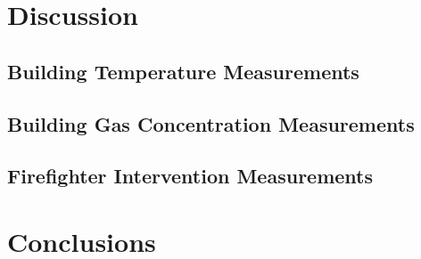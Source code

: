 \documentclass[12pt,oneside]{book}
\begin{document}
\section{Discussion}


\subsection{Building Temperature Measurements}



\subsection{Building Gas Concentration Measurements}

\subsection{Firefighter Intervention Measurements}

\section{Conclusions}
\end{document}
